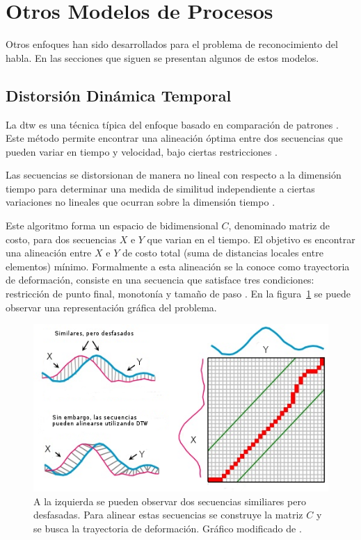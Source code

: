 \section{Otros Modelos de Procesos}
\label{sec:otrosModelos}

Otros enfoques han sido desarrollados para el problema de reconocimiento del habla. En las secciones que siguen
se presentan algunos de estos modelos.

\subsection{Distorsi\'on Din\'amica Temporal}
\label{sec:dtw}

La \gls{dtw} es una t\'ecnica t\'ipica del enfoque basado en comparaci\'on de 
patrones \cite{GaikwadAReview2010}. 
Este m\'etodo permite encontrar una alineaci\'on \'optima entre dos secuencias que pueden variar en 
tiempo y velocidad, bajo ciertas restricciones \cite{MullerInformation2007}.

Las secuencias se distorsionan de manera no lineal con respecto a la dimensi\'on tiempo para determinar 
una medida de similitud independiente a ciertas variaciones no lineales que ocurran sobre la 
dimensi\'on tiempo \cite{AnusuyaSpeech2009}.

Este algoritmo forma un espacio de bidimensional $C$, denominado matriz de costo, para dos secuencias 
$X$ e $Y$ que varian en el tiempo. El objetivo es encontrar
una alineaci\'on entre $X$ e $Y$ de costo total (suma de distancias locales entre elementos) m\'inimo. 
Formalmente a esta alineaci\'on se la conoce como trayectoria de
deformaci\'on, consiste en una secuencia que satisface tres condiciones: restricci\'on de punto final, 
monoton\'ia y tama\~no de paso \cite{MullerInformation2007}. 
En la figura~\ref{figure:dtw} se puede observar una representaci\'on gr\'afica del problema.

\begin{figure}[H]
\centering
\includegraphics[width=0.8\linewidth]{./graphics/dtw.png}
\caption[Alineaci\'on de secuencias mediante distorsi\'on din\'amica temporal.]{A la izquierda 
    se pueden observar dos secuencias similiares pero desfasadas. Para alinear estas secuencias 
    se construye la matriz $C$ y se busca la trayectoria de deformaci\'on. 
    Gr\'afico modificado de \cite{ThanawinDTW}.}
\label{figure:dtw}
\end{figure}

